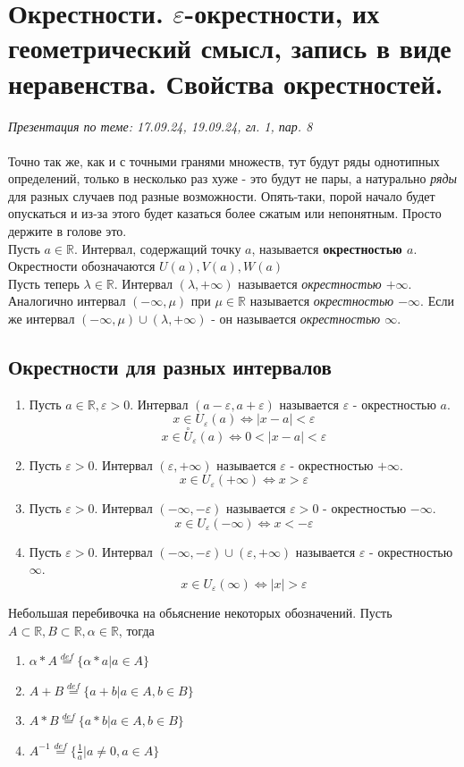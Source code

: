 \documentclass[10pt, a4paper,twocolumn]{article}
\begin{document}
\section{Окрестности. $\varepsilon $-окрестности, их геометрический смысл, запись в виде неравенства. Свойства окрестностей.}
\textsl{Презентация по теме: 17.09.24, 19.09.24, гл. 1, пар. 8}
\\ \\Точно так же, как и с точными гранями множеств, тут будут ряды однотипных определений, только в несколько раз хуже - это будут не пары, а натурально \textsl{ряды} для разных случаев под разные возможности. Опять-таки, порой начало будет опускаться и из-за этого будет казаться более сжатым или непонятным. Просто держите в голове это.
\\Пусть $a \in \mathbb{R}$. Интервал, содержащий точку $a$, называется \textbf{окрестностью $a$}. Окрестности обозначаются $U(a), V(a), W(a)$
\\Пусть теперь $\lambda \in \mathbb{R}$. Интервал $(\lambda, + \infty)$ называется \textsl{окрестностью $+ \infty$}. Аналогично интервал $(-\infty, \mu )$ при $\mu \in \mathbb{R}$ называется \textsl{окрестностью $-\infty$}. Если же интервал $(-\infty, \mu) \cup (\lambda, +\infty)$ - он называется \textsl{окрестностью $\infty$}.
\subsection{Окрестности для разных интервалов}
\begin{enumerate}
    \item Пусть $a \in \mathbb{R}, \varepsilon > 0$. Интервал $(a - \varepsilon, a + \varepsilon)$ называется $\varepsilon$ - окрестностью $a$. $$x \in U_{\varepsilon}(a) \Leftrightarrow |x - a| < \varepsilon $$ $$x \in \stackrel{\circ}{U}_{\varepsilon}(a) \Leftrightarrow 0 < |x - a| < \varepsilon$$
    \item Пусть $\varepsilon > 0$. Интервал $(\varepsilon, +\infty)$ называется $\varepsilon$ - окрестностью $+\infty$. $$x \in U_{\varepsilon}(+\infty) \Leftrightarrow x > \varepsilon$$
    \item Пусть $\varepsilon > 0$. Интервал $(-\infty, -\varepsilon)$ называется $\varepsilon > 0$ - окрестностью $-\infty$. $$x \in U_{\varepsilon}(-\infty) \Leftrightarrow x < -\varepsilon$$
    \item Пусть $\varepsilon > 0$. Интервал $(-\infty, -\varepsilon) \cup (\varepsilon, +\infty)$ называется $\varepsilon$ - окрестностью $\infty$. $$x \in U_{\varepsilon}(\infty) \Leftrightarrow |x| > \varepsilon$$
\end{enumerate}
Небольшая перебивочка на обьяснение некоторых обозначений. Пусть $A \subset \mathbb{R}, B \subset \mathbb{R}, \alpha \in \mathbb{R}$, тогда
\begin{enumerate}
    \item $\alpha * A \stackrel{def}{=} \{\alpha * a | a \in A\}$
    \item $A + B \stackrel{def}{=} \{a + b | a \in A, b \in B\}$
    \item $A * B \stackrel{def}{=} \{a * b | a \in A, b \in B\}$
    \item $A^{-1} \stackrel{def}{=} \{ \frac{1}{a} | a \neq 0, a \in A\}$
\end{enumerate}
\end{document}
